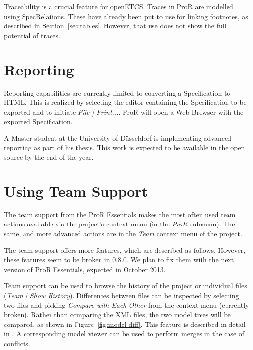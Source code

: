 \documentclass{template/openetcs_report}
\begin{document}
Traceability is a crucial feature for openETCS.  Traces in ProR are modelled using SpecRelations.  These have already been put to use for linking footnotes, as described in Section~\ref{sec:tables}.  However, that use does not show the full potential of traces.

\section{Reporting}

Reporting capabilities are currently limited to converting a Specification to HTML.  This is realized by selecting the editor containing the Specification to be exported and to initiate \emph{File | Print...}.  ProR will open a Web Browser with the exported Specification.

A Master student at the University of Düsseldorf is implementing advanced reporting as part of his thesis.  This work is expected to be available in the open source by the end of the year.

\section{Using Team Support}

The team support from the ProR Essentials makes the most often used team actions available via the project's context menu (in the \emph{ProR} submenu).  The same, and more advanced actions are in the \emph{Team} context menu of the project.

The team support offers more features, which are described as follows.  However, these features seem to be broken in 0.8.0.  We plan to fix them with the next version of ProR Essentials, expected in October 2013.

Team support can be used to browse the history of the project or individual files (\emph{Team | Show History}).  Differences between files can be inspected by selecting two files and picking \emph{Compare with Each Other} from the context menu (currently broken).  Rather than comparing the XML files, the two model trees will be compared, as shown in Figure~\ref{fig:model-diff}.  This feature is described in detail in \cite{essentials_diff}.  A corresponding model viewer can be used to perform merges in the case of conflicts.
\end{document}
